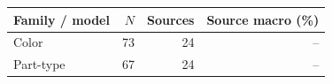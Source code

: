 \begin{tabular}{lrrr}
\toprule
Family / model & $N$ & Sources & Source macro (\%) \\
\midrule
Color & 73 & 24 & -- \\
Part-type & 67 & 24 & -- \\
\bottomrule
\end{tabular}
